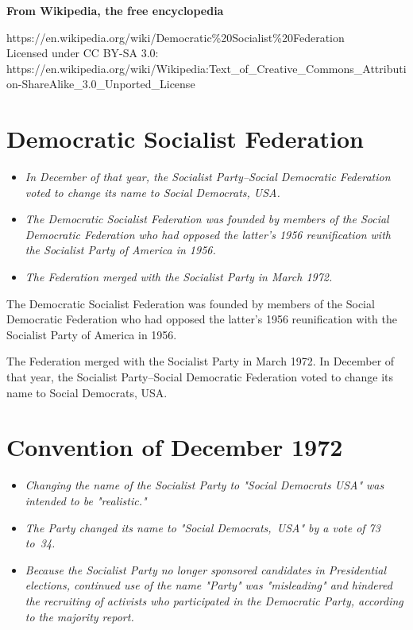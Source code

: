 \textbf{From Wikipedia, the free encyclopedia}

https://en.wikipedia.org/wiki/Democratic\%20Socialist\%20Federation\\
Licensed under CC BY-SA 3.0:\\
https://en.wikipedia.org/wiki/Wikipedia:Text\_of\_Creative\_Commons\_Attribution-ShareAlike\_3.0\_Unported\_License

\section{Democratic Socialist
Federation}\label{democratic-socialist-federation}

\begin{itemize}
\item
  \emph{In December of that year, the Socialist Party--Social Democratic
  Federation voted to change its name to Social Democrats, USA.}
\item
  \emph{The Democratic Socialist Federation was founded by members of
  the Social Democratic Federation who had opposed the latter's 1956
  reunification with the Socialist Party of America in 1956.}
\item
  \emph{The Federation merged with the Socialist Party in March 1972.}
\end{itemize}

The Democratic Socialist Federation was founded by members of the Social
Democratic Federation who had opposed the latter's 1956 reunification
with the Socialist Party of America in 1956.

The Federation merged with the Socialist Party in March 1972. In
December of that year, the Socialist Party--Social Democratic Federation
voted to change its name to Social Democrats, USA.

\section{Convention of December 1972}\label{convention-of-december-1972}

\begin{itemize}
\item
  \emph{Changing the name of the Socialist Party to "Social Democrats
  USA" was intended to be "realistic."}
\item
  \emph{The Party changed its name to "Social Democrats,~USA" by a vote
  of 73 to~34.}
\item
  \emph{Because the Socialist Party no longer sponsored candidates in
  Presidential elections, continued use of the name "Party" was
  "misleading" and hindered the recruiting of activists who participated
  in the Democratic Party, according to the majority report.}
\end{itemize}

